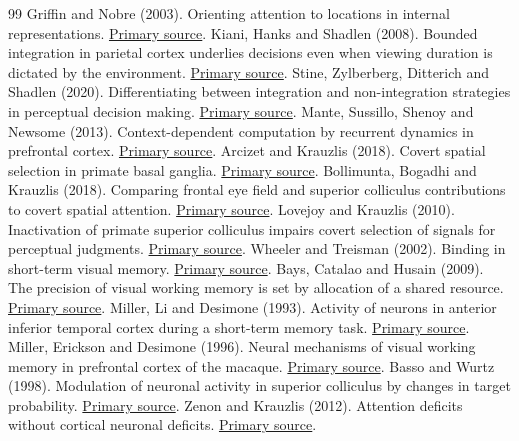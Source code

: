 \documentclass[11pt]{article}
\begin{document}
\begin{thebibliography}{99}
 Griffin and Nobre (2003). Orienting attention to locations in internal representations. \href{https://pubmed.ncbi.nlm.nih.gov/14709235/}{Primary source}.
 Kiani, Hanks and Shadlen (2008). Bounded integration in parietal cortex underlies decisions even when viewing duration is dictated by the environment. \href{https://pmc.ncbi.nlm.nih.gov/articles/PMC6670720/}{Primary source}.
 Stine, Zylberberg, Ditterich and Shadlen (2020). Differentiating between integration and non-integration strategies in perceptual decision making. \href{https://pubmed.ncbi.nlm.nih.gov/32338595/}{Primary source}.
 Mante, Sussillo, Shenoy and Newsome (2013). Context-dependent computation by recurrent dynamics in prefrontal cortex. \href{https://pubmed.ncbi.nlm.nih.gov/24201281/}{Primary source}.
 Arcizet and Krauzlis (2018). Covert spatial selection in primate basal ganglia. \href{https://journals.plos.org/plosbiology/article?id=10.1371/journal.pbio.2005930}{Primary source}.
 Bollimunta, Bogadhi and Krauzlis (2018). Comparing frontal eye field and superior colliculus contributions to covert spatial attention. \href{https://pmc.ncbi.nlm.nih.gov/articles/PMC6120922/}{Primary source}.
 Lovejoy and Krauzlis (2010). Inactivation of primate superior colliculus impairs covert selection of signals for perceptual judgments. \href{https://pubmed.ncbi.nlm.nih.gov/20023651/}{Primary source}.
 Wheeler and Treisman (2002). Binding in short-term visual memory. \href{https://pubmed.ncbi.nlm.nih.gov/11900102/}{Primary source}.
 Bays, Catalao and Husain (2009). The precision of visual working memory is set by allocation of a shared resource. \href{https://pubmed.ncbi.nlm.nih.gov/19810788/}{Primary source}.
 Miller, Li and Desimone (1993). Activity of neurons in anterior inferior temporal cortex during a short-term memory task. \href{https://pubmed.ncbi.nlm.nih.gov/8463829/}{Primary source}.
 Miller, Erickson and Desimone (1996). Neural mechanisms of visual working memory in prefrontal cortex of the macaque. \href{https://pmc.ncbi.nlm.nih.gov/articles/PMC6579322/}{Primary source}.
 Basso and Wurtz (1998). Modulation of neuronal activity in superior colliculus by changes in target probability. \href{https://pubmed.ncbi.nlm.nih.gov/9736670/}{Primary source}.
 Zenon and Krauzlis (2012). Attention deficits without cortical neuronal deficits. \href{https://pubmed.ncbi.nlm.nih.gov/22972195/}{Primary source}.

\end{thebibliography}
\end{document}
